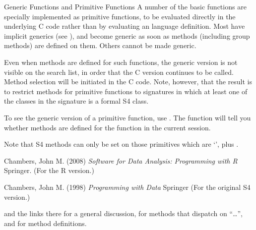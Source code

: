 \begin{Section}{Generic Functions and Primitive Functions}
A number of the basic \R{} functions are specially implemented as
primitive functions, to be evaluated directly in the underlying C
code rather than by evaluating an \R{} language definition.  Most have
implicit generics (see ), and become
generic as soon as methods (including group methods) are defined on
them.  Others cannot be made generic.

Even when methods are defined for such functions, the generic
version is not visible on the search list, in order that the C
version continues to be called.  Method selection will be initiated
in the C code.  Note, however, that the result is to restrict
methods for primitive functions to signatures in which at least one
of the classes in the signature is a formal S4 class.

To see the generic version of a primitive function, use
.  The function
 will tell you whether methods are defined
for the function in the current session.

Note that S4 methods can only be set on those primitives which are
`', plus \code{\%*\%}.
\end{Section}
%
\begin{References}\relax
Chambers, John M. (2008)
\emph{Software for Data Analysis: Programming with R}
Springer.  (For the R version.)

Chambers, John M. (1998)
\emph{Programming with Data}
Springer (For the original S4 version.)
\end{References}
%
\begin{SeeAlso}\relax
{} and the links there for a general discussion,
 for methods that dispatch on
``\dots'', and  for method definitions.
\end{SeeAlso}
%
